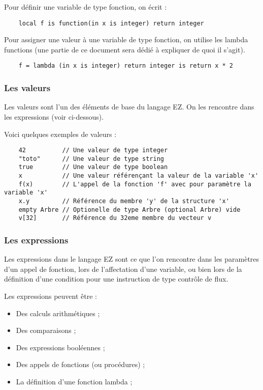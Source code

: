 Pour définir une variable de type fonction, on écrit :
\begin{verbatim}
    local f is function(in x is integer) return integer
\end{verbatim}

Pour assigner une valeur à une variable de type fonction, on utilise les lambda
functions (une partie de ce document sera dédié à expliquer de quoi il s'agit).
\begin{verbatim}
    f = lambda (in x is integer) return integer is return x * 2
\end{verbatim}


\subsubsection{Les valeurs}

Les valeurs sont l'un des éléments de base du langage EZ. On les rencontre
dans les expressions (voir ci-dessous).

Voici quelques exemples de valeurs :
\begin{verbatim}
    42          // Une valeur de type integer
    "toto"      // Une valeur de type string
    true        // Une valeur de type boolean
    x           // Une valeur référençant la valeur de la variable 'x'
    f(x)        // L'appel de la fonction 'f' avec pour paramètre la variable 'x'
    x.y         // Référence du membre 'y' de la structure 'x'
    empty Arbre // Optionelle de type Arbre (optional Arbre) vide
    v[32]       // Référence du 32eme membre du vecteur v
\end{verbatim}


\subsubsection{Les expressions}

Les expressions dans le langage EZ sont ce que l'on rencontre dans les
paramètres d'un appel de fonction, lors de l'affectation d'une variable, ou
bien lors de la définition d'une condition pour une instruction de type
contrôle de flux.

Les expressions peuvent être :
\begin{itemize}
    \item Des calculs arithmétiques ;
    \item Des comparaisons ;
    \item Des expressions booléennes ;
    \item Des appels de fonctions (ou procédures) ;
    \item La définition d'une fonction lambda ;
\end{itemize}

